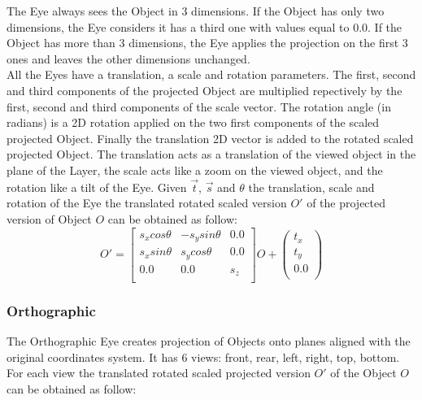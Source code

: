 The Eye always sees the Object in 3 dimensions. If the Object has only two dimensions, the Eye considers it has a third one with values equal to 0.0. If the Object has more than 3 dimensions, the Eye applies the projection on the first 3 ones and leaves the other dimensions unchanged.\\

All the Eyes have a translation, a scale and rotation parameters. The first, second and third components of the projected Object are multiplied repectively by the first, second and third components of the scale vector. The rotation angle (in radians) is a 2D rotation applied on the two first components of the scaled projected Object. Finally the translation 2D vector is added to the rotated scaled projected Object. The translation acts as a translation of the viewed object in the plane of the Layer, the scale acts like a zoom on the viewed object, and the rotation like a tilt of the Eye. Given $\overrightarrow{t}$, $\overrightarrow{s}$ and $\theta$ the translation, scale and rotation of the Eye the translated rotated scaled version $O'$ of the projected version of Object $O$ can be obtained as follow:\\

\begin{equation}
O'=\left[
\begin{array}{ccc}
s_xcos\theta&-s_ysin\theta&0.0\\
s_xsin\theta&s_ycos\theta&0.0\\
0.0&0.0&s_z\\
\end{array}\right]O+\left(
\begin{array}{c}
t_x\\
t_y\\
0.0\\
\end{array}\right)
\end{equation}

\subsubsection{Orthographic}

The Orthographic Eye creates projection of Objects onto planes aligned with the original coordinates system. It has 6 views: front, rear, left, right, top, bottom. For each view the translated rotated scaled projected version $O'$ of the Object $O$ can be obtained as follow:\\

